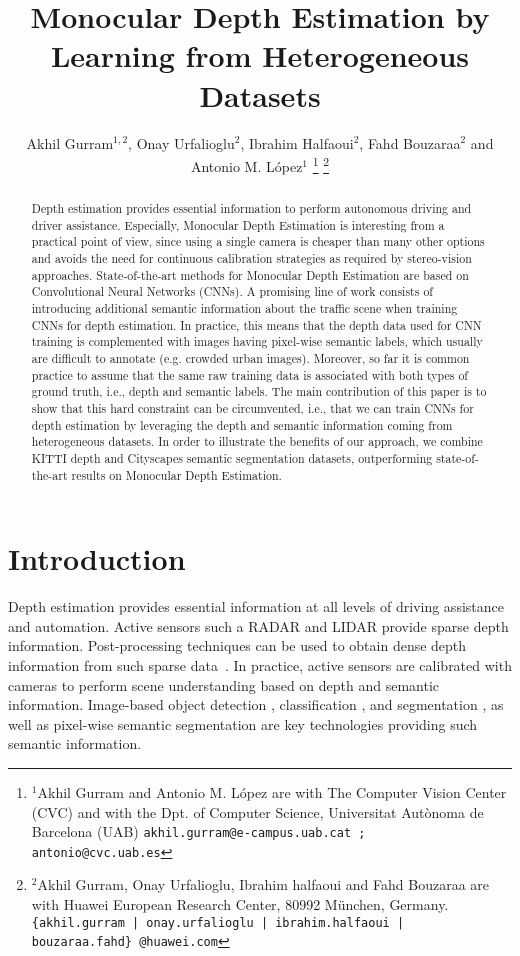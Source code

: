 \documentclass[letterpaper, 10 pt, conference]{ieeeconf}
\title{\LARGE \bf
Monocular Depth Estimation by Learning from Heterogeneous Datasets
}
\author{Akhil Gurram$^{1, 2}$, Onay Urfalioglu$^{2}$, Ibrahim Halfaoui$^{2}$, Fahd Bouzaraa$^{2}$ and Antonio M. L\'opez$^{1}$ \thanks{$^{1}$Akhil Gurram and Antonio M. L\'opez are with The Computer Vision Center (CVC) and with the Dpt. of Computer Science, Universitat Aut\`onoma de Barcelona (UAB) {\tt\small akhil.gurram@e-campus.uab.cat ; antonio@cvc.uab.es} } \thanks{$^{2}$Akhil Gurram, Onay Urfalioglu, Ibrahim halfaoui and Fahd Bouzaraa are with Huawei European Research Center, 80992 M{\"u}nchen, Germany. {\tt\small \{akhil.gurram | onay.urfalioglu | ibrahim.halfaoui | bouzaraa.fahd\}~@huawei.com} } }
\begin{document}
\maketitle
\thispagestyle{empty}
\pagestyle{empty}


\begin{abstract}
Depth estimation provides essential information to perform autonomous driving and driver assistance. Especially, Monocular Depth Estimation is interesting from a practical point of view, since using a single camera is cheaper than many other options and avoids the need for continuous calibration strategies as required by stereo-vision approaches. State-of-the-art methods for Monocular Depth Estimation are based on Convolutional Neural Networks (CNNs). A promising line of work consists of introducing additional semantic information about the traffic scene when training CNNs for depth estimation. In practice, this means that the depth data used for CNN training is complemented with images having pixel-wise semantic labels, which usually are difficult to annotate (e.g. crowded urban images). Moreover, so far it is common practice to assume that the same raw training data is associated with both types of ground truth, i.e., depth and semantic labels. The main contribution of this paper is to show that this hard constraint can be circumvented, i.e., that we can train CNNs for depth estimation by leveraging the depth and semantic information coming from heterogeneous datasets. In order to illustrate the benefits of our approach, we combine KITTI depth and Cityscapes semantic segmentation datasets, outperforming state-of-the-art results on Monocular Depth Estimation.
\end{abstract}

\section{Introduction}

Depth estimation provides essential information at all levels of driving assistance and automation. Active sensors such a RADAR and LIDAR provide sparse depth information. Post-processing techniques can be used to obtain dense depth information from such sparse data~\cite{Premebida:2014}. In practice, active sensors are calibrated with cameras to perform scene understanding based on depth and semantic information. Image-based object detection \cite{Yang:2016}, classification \cite{Zhu:2016}, and segmentation \cite{He:2017}, as well as pixel-wise semantic segmentation \cite{Zhao:2017} are key technologies providing such semantic information. 
\end{document}
